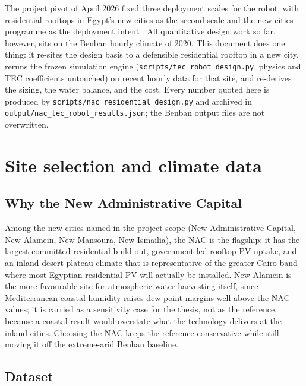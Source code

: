 \documentclass[11pt,a4paper]{article}
\begin{document}
The project pivot of April 2026 fixed three deployment scales for the robot,
with residential rooftops in Egypt's new cities as the second scale and the
new-cities programme as the deployment intent \cite{egypt2030vision}. All
quantitative design work so far, however, sits on the Benban hourly climate
of 2020. This document does one thing: it re-sites the design basis to a
defensible residential rooftop in a new city, reruns the frozen simulation
engine (\texttt{scripts/tec\_robot\_design.py}, physics and TEC coefficients
untouched) on recent hourly data for that site, and re-derives the sizing,
the water balance, and the cost. Every number quoted here is produced by
\texttt{scripts/nac\_residential\_design.py} and archived in
\texttt{output/nac\_tec\_robot\_results.json}; the Benban output files are
not overwritten.

\section{Site selection and climate data}
\label{sec:site}

\subsection{Why the New Administrative Capital}

Among the new cities named in the project scope (New Administrative Capital,
New Alamein, New Mansoura, New Ismailia), the NAC is the flagship: it has the
largest committed residential build-out, government-led rooftop PV uptake,
and an inland desert-plateau climate that is representative of the
greater-Cairo band where most Egyptian residential PV will actually be
installed. New Alamein is the more favourable site for atmospheric water
harvesting itself, since Mediterranean coastal humidity raises dew-point
margins well above the NAC values; it is carried as a sensitivity case for
the thesis, not as the reference, because a coastal result would overstate
what the technology delivers at the inland cities. Choosing the NAC keeps
the reference conservative while still moving it off the extreme-arid Benban
baseline.

\subsection{Dataset}
\end{document}
